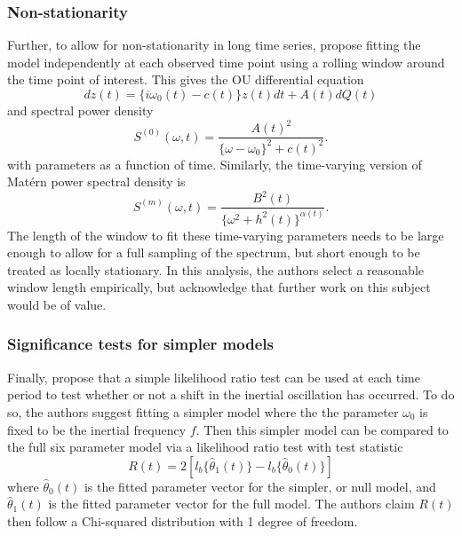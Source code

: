 \documentclass{stat572Style}
\begin{document}
\subsubsection{Non-stationarity}
Further, to allow for non-stationarity in long time series, \citep{Sykulski2016} propose fitting the model independently at each observed time point using a rolling window around the time point of interest. This gives the OU differential equation
\begin{equation}
dz(t) = \{i \omega_{0}(t) - c(t) \} z(t) dt + A(t) dQ(t)
\end{equation}
and spectral power density
\begin{equation}
S^{(0)}(\omega, t) = \frac{A(t)^{2}}{\{\omega - \omega_{0}\}^{2} + c(t)^{2}}. 
\end{equation}
with parameters as a function of time. Similarly, the time-varying version of Mat\'{e}rn power spectral density is 
\begin{equation}
S^{(m)}(\omega, t) = \frac{B^{2}(t)}{\{\omega^{2} + h^{2}(t)\}^{\alpha(t)}}.
\end{equation}
The length of the window to fit these time-varying parameters needs to be large enough to allow for a full sampling of the spectrum, but short enough to be treated as locally stationary.  In this analysis, the authors select a reasonable window length empirically, but acknowledge that further work on this subject would be of value.  

\subsubsection{Significance tests for simpler models}
Finally, \citet{Sykulski2016} propose that a simple likelihood ratio test can be used at each time period to test whether or not a shift in the inertial oscillation has occurred. To do so, the authors suggest fitting a simpler model where the the parameter $\omega_{0}$ is fixed to be the inertial frequency $f$. Then this simpler model can be compared to the full six parameter model via a likelihood ratio test with test statistic
\begin{equation}
\label{eq: LRT}
R(t) = 2[l_{b} \{\hat{\theta}_{1}(t) \} - l_{b}\{\hat{\theta}_{0}(t) \} ]
\end{equation}
where $\hat{\theta}_{0}(t)$ is the fitted parameter vector for the simpler, or null model, and $\hat{\theta}_{1}(t)$ is the fitted parameter vector for the full model. The authors claim $R(t)$ then follow a Chi-squared distribution with 1 degree of freedom.
\end{document}
